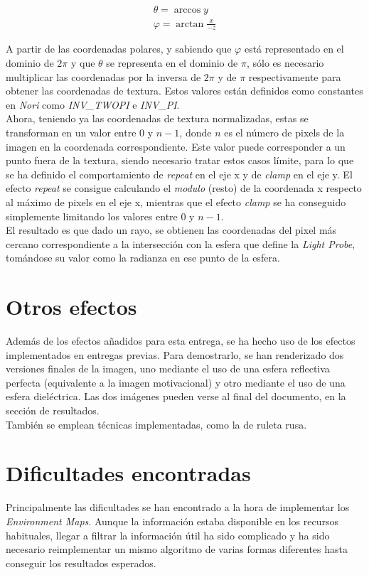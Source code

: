 \documentclass[10pt,oneside,a4paper]{article}
\begin{document}
\begin{gather}
\theta = \arccos{y}\\
\varphi =  \arctan{\frac{x}{-z}}
\end{gather}

A partir de las coordenadas polares, y sabiendo que $\varphi$ está representado en el dominio de $2\pi$ y que $\theta$ se representa en el dominio de $\pi$, sólo es necesario multiplicar las coordenadas por la inversa de $2\pi$ y de $\pi$ respectivamente para obtener las coordenadas de textura. Estos valores están definidos como constantes en \emph{Nori} como \emph{INV\_TWOPI} e \emph{INV\_PI}.\\

Ahora, teniendo ya las coordenadas de textura normalizadas, estas se transforman en un valor entre $0$ y $n-1$, donde $n$ es el número de pixels de la imagen en la coordenada correspondiente. Este valor puede corresponder a un punto fuera de la textura, siendo necesario tratar estos casos límite, para lo que se ha definido el comportamiento de \emph{repeat} en el eje x y de \emph{clamp} en el eje y. El efecto \emph{repeat} se consigue calculando el \emph{modulo} (resto) de la coordenada x respecto al máximo de pixels en el eje x, mientras que el efecto \emph{clamp} se ha conseguido simplemente limitando los valores entre $0$ y $n-1$.\\

El resultado es que dado un rayo, se obtienen las coordenadas del pixel más cercano correspondiente a la intersección con la esfera que define la \emph{Light Probe}, tomándose su valor como la radianza en ese punto de la esfera.

\newpage
\section{Otros efectos}
Además de los efectos añadidos para esta entrega, se ha hecho uso de los efectos implementados en entregas previas. Para demostrarlo, se han renderizado dos versiones finales de la imagen, uno mediante el uso de una esfera reflectiva perfecta (equivalente a la imagen motivacional) y otro mediante el uso de una esfera dieléctrica. Las dos imágenes pueden verse al final del documento, en la sección de resultados.\\

También se emplean técnicas implementadas, como la de ruleta rusa.

\section{Dificultades encontradas}
Principalmente las dificultades se han encontrado a la hora de implementar los \emph{Environment Maps}. Aunque la información estaba disponible en los recursos habituales, llegar a filtrar la información útil ha sido complicado y ha sido necesario reimplementar un mismo algoritmo de varias formas diferentes hasta conseguir los resultados esperados. \\
\end{document}
